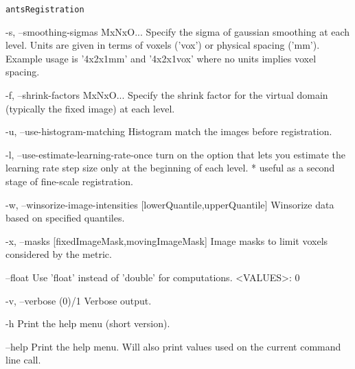\documentclass[ignorenonframetext,]{beamer}
\newenvironment{Shaded}{\begin{snugshade}}{\end{snugshade}}
\newcommand{\StringTok}[1]{\textcolor[rgb]{0.31,0.60,0.02}{{#1}}}
\newcommand{\NormalTok}[1]{{#1}}
\begin{document}
\begin{frame}[fragile]{\texttt{antsRegistration}}
\begin{Shaded}
\begin{Highlighting}[]
\StringTok{     -s, --smoothing-sigmas MxNxO...}
\StringTok{          Specify the sigma of gaussian smoothing at each level. Units are given in terms}
\StringTok{          of voxels ('}\NormalTok{vox}\StringTok{') or physical spacing ('}\NormalTok{mm}\StringTok{'). Example usage is '}\NormalTok{4x2x1mm}\StringTok{' and}
\StringTok{          '}\NormalTok{4x2x1vox}\StringTok{' where no units implies voxel spacing.}

\StringTok{     -f, --shrink-factors MxNxO...}
\StringTok{          Specify the shrink factor for the virtual domain (typically the fixed image) at}
\StringTok{          each level.}

\StringTok{     -u, --use-histogram-matching}
\StringTok{          Histogram match the images before registration.}

\StringTok{     -l, --use-estimate-learning-rate-once}
\StringTok{          turn on the option that lets you estimate the learning rate step size only at}
\StringTok{          the beginning of each level. * useful as a second stage of fine-scale}
\StringTok{          registration.}

\StringTok{     -w, --winsorize-image-intensities [lowerQuantile,upperQuantile]}
\StringTok{          Winsorize data based on specified quantiles.}

\StringTok{     -x, --masks [fixedImageMask,movingImageMask]}
\StringTok{          Image masks to limit voxels considered by the metric.}

\StringTok{     --float}
\StringTok{          Use '}\NormalTok{float}\StringTok{' instead of '}\NormalTok{double}\StringTok{' for computations.}
\StringTok{          <VALUES>: 0}

\StringTok{     -v, --verbose (0)/1}
\StringTok{          Verbose output.}

\StringTok{     -h}
\StringTok{          Print the help menu (short version).}

\StringTok{     --help}
\StringTok{          Print the help menu. Will also print values used on the current command line}
\StringTok{          call.}
\end{Highlighting}
\end{Shaded}

\end{frame}
\end{document}
